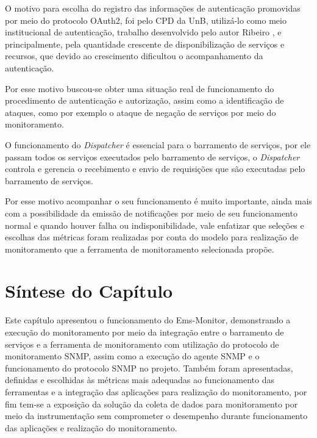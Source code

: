 O motivo para escolha do registro das informações de autenticação promovidas por meio do protocolo OAuth2, foi pelo \acrshort{CPD} da \acrshort{UnB}, utilizá-lo como meio institucional de autenticação, trabalho desenvolvido pelo autor Ribeiro \cite{ribeiro2017implementaccao}, e principalmente, pela quantidade crescente de disponibilização de serviços e recursos, que devido ao crescimento dificultou o acompanhamento da autenticação. 

Por esse motivo buscou-se obter uma situação real de funcionamento do procedimento de autenticação e autorização, assim como a identificação de ataques, como por exemplo o ataque de negação de serviços por meio do monitoramento. 

O funcionamento do \textit{Dispatcher} é essencial para o barramento de serviços, por ele passam todos os serviços executados pelo barramento de serviços, o \textit{Dispatcher} controla e gerencia o recebimento e envio de requisições que são executadas pelo barramento de serviços.

Por esse motivo acompanhar o seu funcionamento é muito importante, ainda mais com a possibilidade da emissão de notificações por meio de seu funcionamento normal e quando houver falha ou indisponibilidade, vale enfatizar que seleções e escolhas das métricas foram realizadas por conta do modelo para realização de monitoramento que a ferramenta de monitoramento selecionada propõe.   


\section{Síntese do Capítulo}
\label{sintese4}

Este capítulo apresentou o funcionamento do Ems-Monitor, demonstrando a execução do monitoramento por meio da integração entre o barramento de serviços e a ferramenta de monitoramento com utilização do protocolo de monitoramento \acrshort{SNMP}, assim como a execução do agente \acrshort{SNMP} e o funcionamento do protocolo \acrshort{SNMP} no projeto. Também foram apresentadas, definidas e escolhidas às métricas mais adequadas ao funcionamento das ferramentas e a integração das aplicações para realização do monitoramento, por fim tem-se a exposição da solução da coleta de dados para monitoramento por meio da instrumentação sem comprometer o desempenho durante funcionamento das aplicações e realização do monitoramento. 
